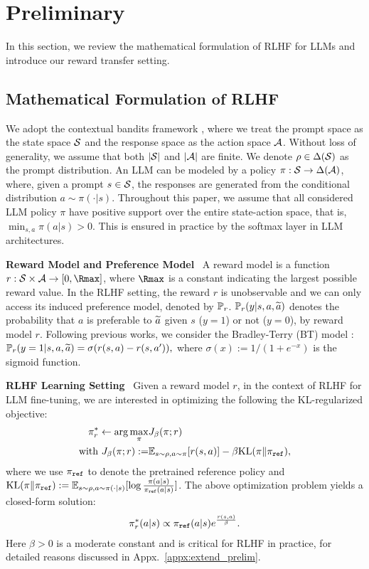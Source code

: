 \section{Preliminary}
In this section, we review the mathematical formulation of RLHF for LLMs and introduce our reward transfer setting.
\subsection{Mathematical Formulation of RLHF}
We adopt the contextual bandits framework \citep{lattimore2020bandit, ouyang2022training}, where we treat the prompt space as the state space $\mathcal{S}$ and the response space as the action space $\mathcal{A}$.
Without loss of generality, we assume that both $|\mathcal{S}|$ and $|\mathcal{A}|$ are finite.
We denote $\rho \in \Delta(\mathcal{S})$ as the prompt distribution.
An LLM can be modeled by a policy $\pi : \mathcal{S}\rightarrow \Delta(\mathcal{A})$, where, given a prompt $s\in\mathcal{S}$, the responses are generated from the conditional distribution $a\sim\pi(\cdot|s)$.
Throughout this paper, we assume that all considered LLM policy $\pi$ have positive support over the entire state-action space, that is, $\min_{s,a}\pi(a|s) > 0$. This is ensured in practice by the softmax layer in LLM architectures. 


\textbf{Reward Model and Preference Model}~
A reward model is a function $r:\cS\times\cA\rightarrow[0, {\Rmax}]$, where $\Rmax$ is a constant indicating the largest possible reward value.
In the RLHF setting, the reward $r$ is unobservable and we can only access its induced preference model, denoted by ${\mathbb{P}}_{r}$. ${\mathbb{P}}_{r}(y|s,a,\widetilde{a})$ denotes the probability that $a$ is preferable to $\widetilde{a}$ given $s$ ($y=1$) or not ($y=0$), by reward model $r$.
Following previous works, we consider the Bradley-Terry (BT) model \citep{bradley1952rank}:
%
    $
    {\mathbb{P}}_{r}(y=1|s,a,\widetilde{a}) = \sigma(r(s,a) - r(s,a')),
    $
%
where $\sigma(x) := 1/(1+e^{-x})$ is the sigmoid function.

\textbf{RLHF Learning Setting}~
Given a reward model $r$, in the context of RLHF for LLM fine-tuning, we are interested in optimizing the following the KL-regularized objective:
\begin{align}
    \pi^*_r \gets \arg\max_{\pi} & J_\beta(\pi;r) \nonumber\\
    \text{with~}J_\beta(\pi;r):=& \mathbb{E}_{s\sim \rho, a\sim\pi}[r(s,a)] - \beta \text{KL}(\pi \| \pi_{\texttt{ref}}),\label{eq:rlhf_obj}
\end{align}
where we use $\pi_{\texttt{ref}}$ to denote the pretrained reference policy and $\text{KL}(\pi\|\pi_{\texttt{ref}}) := \mathbb{E}_{s\sim\rho,a\sim\pi(\cdot|s)}[\log\frac{\pi(a|s)}{\pi_{\texttt{ref}}(a|s)}]$.
The above optimization problem yields a closed-form solution:
\begin{align}
    \pi^*_r(a|s) \propto \pi_{\texttt{ref}}(a|s)e^{\frac{r(s,a)}{\beta} }. \label{eq:closed_form}
\end{align}
Here $\beta>0$ is a moderate constant and is critical for RLHF in practice, for detailed reasons discussed in Appx.~\ref{appx:extend_prelim}.
%
%
%
%

